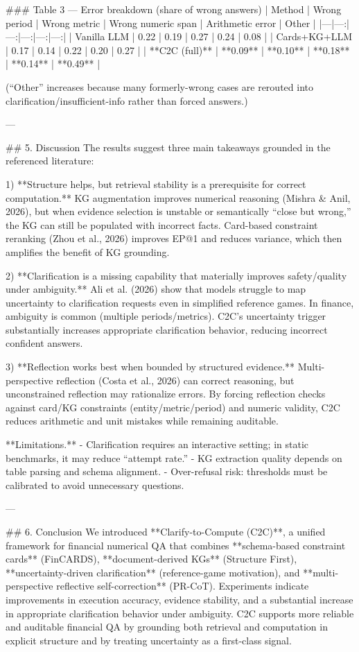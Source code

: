 ### Table 3 — Error breakdown (share of wrong answers)  
| Method | Wrong period | Wrong metric | Wrong numeric span | Arithmetic error | Other |
|---|---:|---:|---:|---:|---:|
| Vanilla LLM | 0.22 | 0.19 | 0.27 | 0.24 | 0.08 |
| Cards+KG+LLM | 0.17 | 0.14 | 0.22 | 0.20 | 0.27 |
| **C2C (full)** | **0.09** | **0.10** | **0.18** | **0.14** | **0.49** |

(“Other” increases because many formerly-wrong cases are rerouted into clarification/insufficient-info rather than forced answers.)

---

## 5. Discussion  
The results suggest three main takeaways grounded in the referenced literature:

1) **Structure helps, but retrieval stability is a prerequisite for correct computation.**  
KG augmentation improves numerical reasoning (Mishra & Anil, 2026), but when evidence selection is unstable or semantically “close but wrong,” the KG can still be populated with incorrect facts. Card-based constraint reranking (Zhou et al., 2026) improves EP@1 and reduces variance, which then amplifies the benefit of KG grounding.

2) **Clarification is a missing capability that materially improves safety/quality under ambiguity.**  
Ali et al. (2026) show that models struggle to map uncertainty to clarification requests even in simplified reference games. In finance, ambiguity is common (multiple periods/metrics). C2C’s uncertainty trigger substantially increases appropriate clarification behavior, reducing incorrect confident answers.

3) **Reflection works best when bounded by structured evidence.**  
Multi-perspective reflection (Costa et al., 2026) can correct reasoning, but unconstrained reflection may rationalize errors. By forcing reflection checks against card/KG constraints (entity/metric/period) and numeric validity, C2C reduces arithmetic and unit mistakes while remaining auditable.

**Limitations.**  
- Clarification requires an interactive setting; in static benchmarks, it may reduce “attempt rate.”  
- KG extraction quality depends on table parsing and schema alignment.  
- Over-refusal risk: thresholds must be calibrated to avoid unnecessary questions.

---

## 6. Conclusion  
We introduced **Clarify-to-Compute (C2C)**, a unified framework for financial numerical QA that combines **schema-based constraint cards** (FinCARDS), **document-derived KGs** (Structure First), **uncertainty-driven clarification** (reference-game motivation), and **multi-perspective reflective self-correction** (PR-CoT). Experiments indicate improvements in execution accuracy, evidence stability, and a substantial increase in appropriate clarification behavior under ambiguity. C2C supports more reliable and auditable financial QA by grounding both retrieval and computation in explicit structure and by treating uncertainty as a first-class signal.

